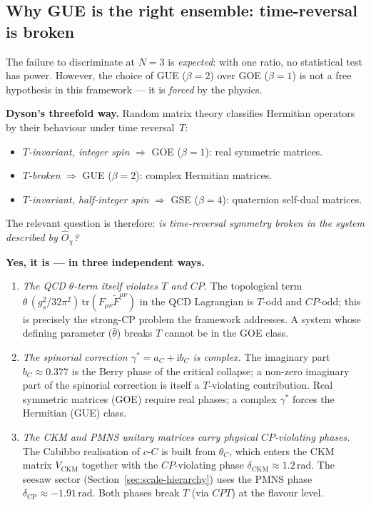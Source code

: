 \documentclass[11pt,a4paper]{article}
\newcommand{\cC}{c\text{-}C}
\newcommand{\Opchi}{\hat{O}_\chi}
\providecommand{\ii}{}
\renewcommand{\ii}{\mathrm{i}}
\providecommand{\tr}{}
\renewcommand{\tr}{\mathrm{tr}}
\theoremstyle{plain}
\theoremstyle{definition}
\theoremstyle{remark}
\begin{document}
\subsection{Why GUE is the right ensemble: time-reversal is broken}
\label{sec:why-gue}

The failure to discriminate at $N=3$ is \emph{expected}: with one
ratio, no statistical test has power.  However, the choice of GUE
($\beta = 2$) over GOE ($\beta = 1$) is not a free hypothesis in
this framework --- it is \emph{forced} by the physics.

\medskip\noindent
\textbf{Dyson's threefold way.}  Random matrix theory classifies
Hermitian operators by their behaviour under time reversal~$T$:
\begin{itemize}[leftmargin=1.6em,itemsep=2pt]
  \item \emph{$T$-invariant, integer spin} $\Rightarrow$ GOE
        ($\beta = 1$): real symmetric matrices.
  \item \emph{$T$-broken} $\Rightarrow$ GUE ($\beta = 2$): complex
        Hermitian matrices.
  \item \emph{$T$-invariant, half-integer spin} $\Rightarrow$ GSE
        ($\beta = 4$): quaternion self-dual matrices.
\end{itemize}
The relevant question is therefore: \emph{is time-reversal
symmetry broken in the system described by $\Opchi$?}

\medskip\noindent
\textbf{Yes, it is --- in three independent ways.}
\begin{enumerate}[leftmargin=1.6em,itemsep=2pt]
  \item \emph{The QCD $\theta$-term itself violates $T$ and $CP$.}
        The topological term
        $\theta\,(g_s^2/32\pi^2)\,\tr(F_{\mu\nu}\tilde F^{\mu\nu})$
        in the QCD Lagrangian is $T$-odd and $CP$-odd; this is
        precisely the strong-CP problem the framework addresses.
        A system whose defining parameter ($\bar\theta$) breaks $T$
        cannot be in the GOE class.
  \item \emph{The spinorial correction $\gamma^\ast = a_C + \ii b_C$
        is complex.}  The imaginary part $b_C \approx 0.377$ is the
        Berry phase of the critical collapse; a non-zero imaginary
        part of the spinorial correction is itself a $T$-violating
        contribution.  Real symmetric matrices (GOE) require real
        phases; a complex $\gamma^\ast$ forces the Hermitian
        (GUE) class.
  \item \emph{The CKM and PMNS unitary matrices carry physical
        $CP$-violating phases.}  The Cabibbo realisation of $\cC$
        is built from $\theta_C$, which enters the CKM matrix
        $V_{\mathrm{CKM}}$ together with the $CP$-violating phase
        $\delta_{\mathrm{CKM}} \approx 1.2\,\mathrm{rad}$.  The
        seesaw sector (Section~\ref{sec:scale-hierarchy}) uses the
        PMNS phase $\delta_{\mathrm{CP}} \approx -1.91\,\mathrm{rad}$.
        Both phases break $T$ (via $CPT$) at the flavour level.
\end{enumerate}
\end{document}
